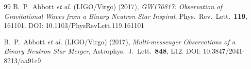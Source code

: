 \documentclass[11pt]{article}
\begin{document}
\begin{thebibliography}{99}
        B.~P.~Abbott \textit{et al.} (LIGO/Virgo) (2017),
        \textit{GW170817: Observation of Gravitational Waves from a Binary Neutron Star Inspiral},
        Phys.\ Rev.\ Lett.\ \textbf{119}, 161101.
        DOI: 10.1103/PhysRevLett.119.161101

        B.~P.~Abbott \textit{et al.} (LIGO/Virgo) (2017),
        \textit{Multi-messenger Observations of a Binary Neutron Star Merger},
        Astrophys.\ J.\ Lett.\ \textbf{848}, L12.
        DOI: 10.3847/2041-8213/aa91c9

    \end{thebibliography}
\end{document}
